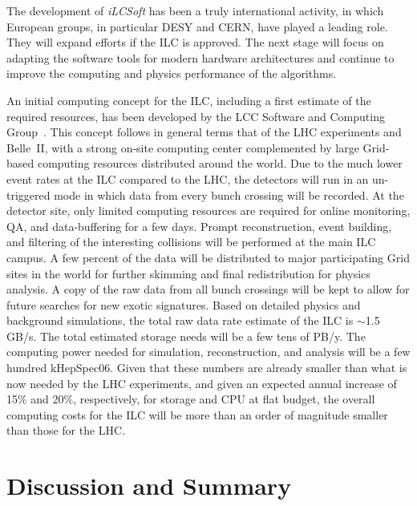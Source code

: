 \documentclass[%
 reprint,
 floatfix,
 amsmath,amssymb,
 aps,
]{revtex4-1}
\begin{document}
The development of \emph{iLCSoft} has been 
 a truly international activity, in which European groups, in particular DESY and
CERN, have played a leading role.  They 
will expand efforts if the ILC is approved.  The next stage
will 
focus on adapting the software tools for
 modern hardware architectures and continue to
improve the computing and physics performance of the algorithms.


An initial computing concept for the ILC, including a first estimate of the required resources, has been developed by the LCC Software and Computing Group~\cite{bib:lcc_computing}.
This concept follows in general terms that of the LHC experiments and
Belle~II,  with a strong on-site computing center complemented by large
Grid-based computing resources distributed around the world. Due to the much lower event rates at the ILC compared to the LHC, 
the detectors will run in an un-triggered mode in which  data from every bunch crossing will be recorded. At the detector site,  only limited computing
resources are required for online monitoring, QA, and data-buffering for a few
days.
 Prompt reconstruction, event building, and filtering of the interesting collisions
will be performed at the main ILC campus.
A few percent of the data will be distributed to major participating Grid sites
in the world for further skimming and final redistribution for physics
analysis. A copy of the raw data from all bunch crossings will be kept
to allow
 for future searches for new exotic signatures. 
Based on detailed physics and background simulations,
 the total raw data rate estimate of the ILC is $\sim$1.5 GB/s.
The total estimated storage needs will be a few tens of PB/y.
The computing power needed for simulation, reconstruction, and analysis will be a few hundred kHepSpec06.
Given that these numbers are already smaller than what is now
needed by the LHC experiments, and given an expected annual increase
of 15\% and 20\%, respectively, for storage and CPU
at flat budget, the overall computing costs for the ILC
will be more than an order of magnitude smaller than those for the LHC.

\vspace{-.4cm}

\section{\label{sec:discuss}Discussion and Summary}

\vspace{-.3cm}
\end{document}
